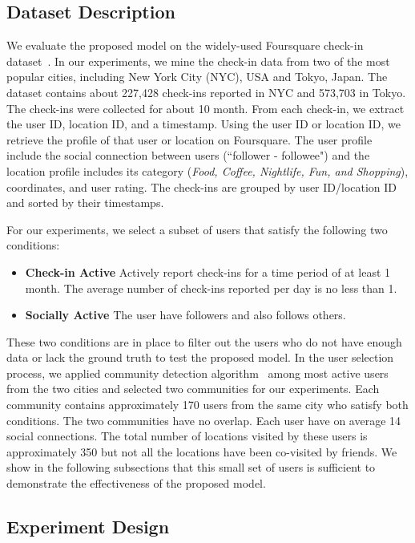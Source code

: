 \subsection{Dataset Description}

We evaluate the proposed model on the widely-used Foursquare check-in dataset~\cite{yang2015nationtelescope}. In our experiments, we mine the check-in data from two of the most popular cities, including New York City (NYC), USA and Tokyo, Japan. The dataset contains about 227,428 check-ins reported in NYC and 573,703 in Tokyo. The check-ins were collected for about 10 month. From each check-in, we extract the user ID, location ID, and a timestamp. Using the user ID or location ID, we retrieve the profile of that user or location on Foursquare. The user profile include the social connection between users (``follower - followee") and the location profile includes its category (\textit{Food, Coffee, Nightlife, Fun, and Shopping}), coordinates, and user rating. The check-ins are grouped by user ID/location ID and sorted by their timestamps.

For our experiments, we select a subset of users that satisfy the following two conditions:
\begin{itemize}
\item \textbf{Check-in Active} Actively report check-ins for a time period of at least 1 month. The average number of check-ins reported per day is no less than 1.
\item \textbf{Socially Active} The user have followers and also follows others.
\end{itemize}
These two conditions are in place to filter out the users who do not have enough data or lack the ground truth to test the proposed model. In the user selection process, we applied community detection algorithm~\cite{fortunato2010community} among most active users from the two cities and selected two communities for our experiments. Each community contains approximately 170 users from the same city who satisfy both conditions. The two communities have no overlap. Each user have on average 14 social connections. The total number of locations visited by these users is approximately 350 but not all the locations have been co-visited by friends. We show in the following subsections that this small set of users is sufficient to demonstrate the effectiveness of the proposed model.

\subsection{Experiment Design}

